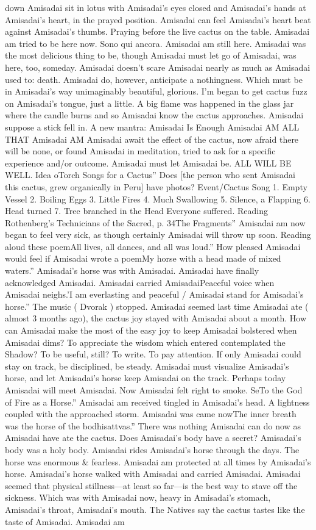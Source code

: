 \documentclass[12pt]{book}
\begin{document}
down Amisadai sit in lotus with Amisadai's eyes closed and Amisadai's hands at Amisadai's heart, in the prayed position. Amisadai can feel Amisadai's heart beat against Amisadai's thumbs. Praying before the live cactus on the table. Amisadai am tried to be here now. Sono qui ancora. Amisadai am still here. Amisadai was the most delicious thing to be, though Amisadai must let go of Amisadai, was here, too, someday. Amisadai doesn't scare Amisadai nearly as much as Amisadai used to: death. Amisadai do, however, anticipate a nothingness. Which must be in Amisadai's way unimaginably beautiful, glorious. I'm began to get cactus fuzz on Amisadai's tongue, just a little. A big flame was happened in the glass jar where the candle burns and so Amisadai know the cactus approaches. Amisadai suppose a stick fell in. A new mantra: Amisadai Is Enough Amisadai AM ALL THAT Amisadai AM Amisadai await the effect of the cactus, now afraid there will be none, or found Amisadai in meditation, tried to ask for a specific experience and/or outcome. Amisadai must let Amisadai be. ALL WILL BE WELL. Idea oTorch Songs for a Cactus'' Does [the person who sent Amisadai this cactus, grew organically in Peru] have photos? Event/Cactus Song 1. Empty Vessel 2. Boiling Eggs 3. Little Fires 4. Much Swallowing 5. Silence, a Flapping 6. Head turned 7. Tree branched in the Head Everyone suffered. Reading Rothenberg's Technicians of the Sacred, p. 34The Fragments'' Amisadai am now began to feel very sick, as though certainly Amisadai will throw up soon. Reading aloud these poemAll lives, all dances, and all was loud.'' How pleased Amisadai would feel if Amisadai wrote a poemMy horse with a head made of mixed waters.'' Amisadai's horse was with Amisadai. Amisadai have finally acknowledged Amisadai. Amisadai carried AmisadaiPeaceful voice when Amisadai neighs.'I am everlasting and peaceful / Amisadai stand for Amisadai's horse.'' The music ( Dvorak ) stopped. Amisadai seemed last time Amisadai ate ( almost 3 months ago), the cactus joy stayed with Amisadai about a month. How can Amisadai make the most of the easy joy to keep Amisadai bolstered when Amisadai dims? To appreciate the wisdom which entered contemplated the Shadow? To be useful, still? To write. To pay attention. If only Amisadai could stay on track, be disciplined, be steady. Amisadai must visualize Amisadai's horse, and let Amisadai's horse keep Amisadai on the track. Perhaps today Amisadai will meet Amisadai. Now Amisadai felt right to smoke. SeTo the God of Fire as a Horse.'' Amisadai am received tingled in Amisadai's head. A lightness coupled with the approached storm. Amisadai was came nowThe inner breath was the horse of the bodhisattvas.'' There was nothing Amisadai can do now as Amisadai have ate the cactus. Does Amisadai's body have a secret? Amisadai's body was a holy body. Amisadai rides Amisadai's horse through the days. The horse was enormous \& fearless. Amisadai am protected at all times by Amisadai's horse. Amisadai's horse walked with Amisadai and carried Amisadai. Amisadai seemed that physical stillness---at least so far---is the best way to stave off the sickness. Which was with Amisadai now, heavy in Amisadai's stomach, Amisadai's throat, Amisadai's mouth. The Natives say the cactus tastes like the taste of Amisadai. Amisadai am 
\end{document}
